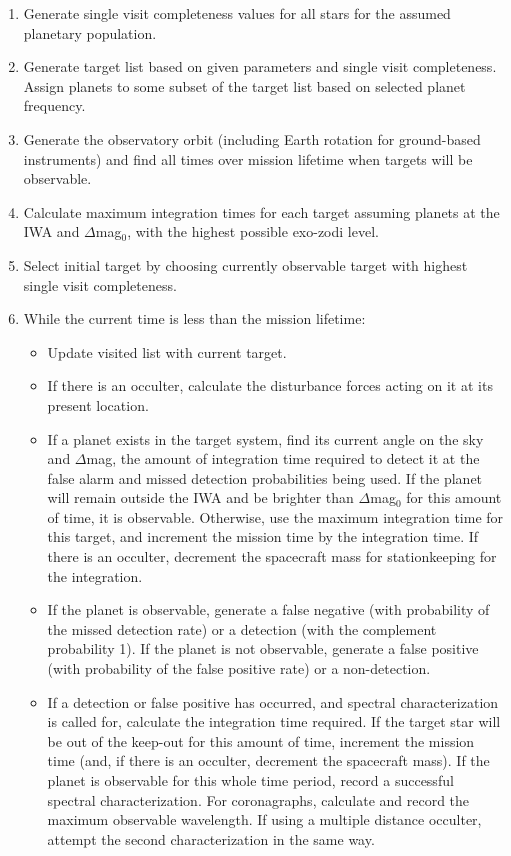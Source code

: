 \begin{enumerate}
\item Generate single visit completeness values for all stars for the assumed planetary population. 
\item Generate target list based on given parameters and single visit completeness.  Assign planets to some subset of the target list based on selected planet frequency.
\item Generate the observatory orbit (including Earth rotation for ground-based instruments) and find all times over mission lifetime when targets will be observable.
\item Calculate maximum integration times for each target assuming planets at the IWA and $\Delta$mag$_0$, with the highest possible exo-zodi level.
\item Select initial target by choosing currently observable target with highest single visit completeness.
\item While the current time is less than the mission lifetime:
\begin{itemize}
\item Update visited list with current target.
\item If there is an occulter, calculate the disturbance forces acting on it at its present location.
\item If a planet exists in the target system, find its current angle on the sky and $\Delta$mag, the amount of  integration time required to detect it at the false alarm and missed detection probabilities being used.  If the planet will remain outside the IWA and be brighter than $\Delta$mag$_0$ for this amount of time, it is observable.  Otherwise, use the maximum integration time for this target, and increment the mission time by the integration time. If there is an occulter, decrement the spacecraft mass for stationkeeping for the integration.
\item If the planet is observable, generate a false negative (with probability of the missed detection rate) or a detection (with the complement probability 1).  If the planet is not observable, generate a false positive (with probability of the false positive rate) or a non-detection.
\item If a detection or false positive has occurred, and spectral characterization is called for, calculate the integration time required.  If the target star will be out of the keep-out for this amount of time, increment the mission time (and, if there is an occulter, decrement the spacecraft mass).  If the planet is observable for this whole time period, record a successful spectral characterization.  For coronagraphs, calculate and record the maximum observable wavelength.  If using a multiple distance occulter, attempt the second characterization in the same way.  

\end{itemize}
\end{enumerate}
